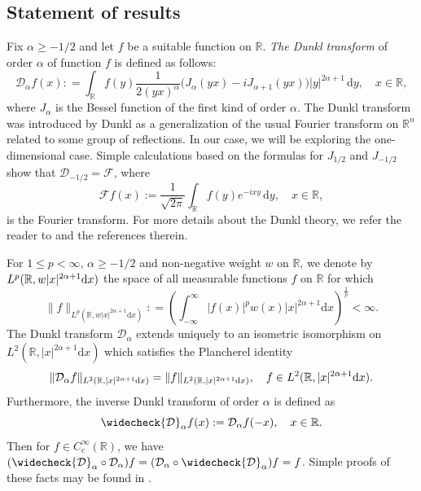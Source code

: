 \documentclass[11pt,oneside]{amsart}
\numberwithin{equation}{section}
\theoremstyle{definition}
\begin{document}
\subsection{Statement of results}
Fix $\alpha \geq -1/2$ and let $f$ be a suitable function on $\mathbb{R}$. \textit{The Dunkl transform} of order $\alpha$ of function $f$ is defined as follows:
\begin{equation}\label{tfd}
\mathcal{D}_\alpha f(x): = \int_\mathbb{R} f(y) \frac{1}{2(yx)^\alpha} \big(J_{\alpha}(yx) - iJ_{\alpha+1}(yx)\big) |y|^{2\alpha+1} \, \mathrm{d}y, \quad x \in \mathbb{R},
\end{equation}
where $J_{\alpha}$ is the Bessel function of the first kind of order $\alpha$. The Dunkl transform was introduced by Dunkl \cite{Dunkl} as a generalization of the usual Fourier transform on $\mathbb{R}^n$ related to some group of reflections. In our case, we will be exploring the one-dimensional case. Simple calculations based on the formulas for $J_{1/2}$ and $J_{-1/2}$ show that $\mathcal{D}_{-1/2} = \mathcal{F}$, where
\begin{equation}\label{fouriertrans}
\mathcal{F} f(x) := \frac{1}{\sqrt{2\pi}} \int_\mathbb{R} f(y) e^{-ixy} \, \mathrm{d}y, \quad x \in \mathbb{R},
\end{equation}
is the Fourier transform. For more details about the Dunkl theory, we refer the reader to \cite{Ros1, Ros2} and the references therein.

For $1 \leq p < \infty$, $\alpha\geq-1/2$ and non-negative weight $w$ on $\mathbb{R}$, we denote by $L^p(\mathbb{R}, w|x|^{2\alpha+1}{\rm d}x)$ the space of all measurable functions $f$ on $\mathbb{R}$ for which
\begin{equation*}
    \|f\|_{L^p(\mathbb{R},w|x|^{2\alpha+1}\mathrm{d}x)}: = \left( \int_{-\infty}^\infty |f(x)|^p w(x)|x|^{2\alpha+1} \mathrm{d}x \right)^{\frac{1}{p}} < \infty.
\end{equation*}
The Dunkl transform $\mathcal{D}_\alpha$ extends uniquely to an isometric isomorphism on $L^2(\mathbb{R},|x|^{2\alpha+1}\mathrm{d}x)$ which satisfies the Plancherel identity
\begin{equation*}
    \|\mathcal{D}_\alpha f\|_{L^2(\mathbb{R},|x|^{2\alpha+1}\mathrm{d}x)} = \|f\|_{L^2(\mathbb{R},|x|^{2\alpha+1}{\rm d}x)}, \quad f \in L^2(\mathbb{R},|x|^{2\alpha+1}\mathrm{d}x).
\end{equation*}
Furthermore, the inverse Dunkl transform of order $\alpha$ is defined as
\begin{equation*}
    \widecheck{\mathcal{D}}_\alpha f(x) := \mathcal{D}_\alpha f(-x), \quad x \in \mathbb{R}.
\end{equation*}
Then for $f \in C_{\mathrm{c}}^\infty(\mathbb{R})$, we have $(\widecheck{\mathcal{D}}_\alpha \circ \mathcal{D}_\alpha) f = (\mathcal{D}_\alpha \circ \widecheck{\mathcal{D}}_\alpha)  f= f$. Simple proofs of these facts may be found in \cite[Proposition 1.3]{NowakStempak}.
\end{document}
